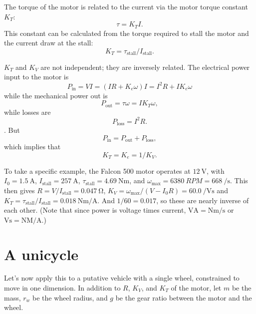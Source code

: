\documentclass[12pt]{article}
\begin{document}
The torque of the motor is related to the current via the motor
torque constant $K_T$:
\begin{equation}
  \tau = K_T I.
\end{equation}
This constant can be calculated from the torque required to stall the motor
and the current draw at the stall:
\begin{equation}
  K_T = \tau_{\textrm{stall}} / I_{\textrm{stall}}.
\end{equation}

$K_T$ and $K_V$ are not independent; they are inversely related.
The electrical power input to the motor is
\begin{equation}
  P_{\textrm{in}} = VI = (IR + K_e\omega)I = I^2R + IK_e\omega
\end{equation}
while the mechanical power out is
\begin{equation}
  P_{\textrm{out}} = \tau\omega = IK_T\omega,
\end{equation}
while losses are
\begin{equation}
  P_{\textrm{loss}} = I^2R.
\end{equation}.
But
\begin{equation}
  P_{\textrm{in}} = P_{\textrm{out}} + P_{\textrm{loss}},
\end{equation}
which implies that
\begin{equation}
  K_T = K_e = 1/K_V.
\end{equation}

To take a specific example, the Falcon 500  motor operates at $\SI{12}{\V}$,
with $I_0 = \SI{1.5}{\A}$, $I_{\textrm{stall}} = \SI{257}{\A}$,
$\tau_{\textrm{stall}} = \SI{4.69}{\N\m}$,
and $\omega_{\max} = \SI{6380}{RPM} = \SI{668}{/\s}$.
This then gives $R=V/I_{\textrm{stall}}=\SI{0.047}{\ohm}$,
$K_V = \omega_{\max} / (V-I_0R) = \SI{60.0}{/\V\s}$ and
$K_T = \tau_{\textrm{stall}} / I_{\textrm{stall}} = \SI{0.018}{\N\m/\A}$.
And $1/60 = 0.017$, so these are nearly inverse of each other.
(Note that since power is voltage times current,
$\textrm{VA} = \textrm{Nm}/\textrm{s}$ or $\textrm{Vs} = \textrm{NM}/\textrm{A}$.)


\section{A unicycle}

Let's now apply this to a putative vehicle with a single wheel,
constrained to move in one dimension.  In addition to
$R$, $K_V$, and $K_T$ of the motor, let $m$ be the mass,
$r_w$ be the wheel radius, and $g$ be the gear ratio between
the motor and the wheel.
\end{document}
